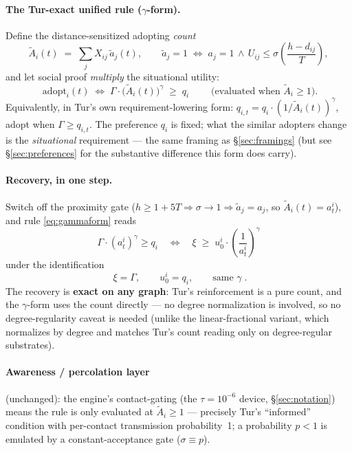 \documentclass[11pt,a4paper]{article}
\newcommand{\atil}{\tilde{a}}               %
\newcommand{\Acount}{\tilde{A}}             %
\begin{document}
\paragraph{The Tur-exact unified rule ($\gamma$-form).} Define the distance-sensitized
adopting \emph{count}
\begin{equation}
  \Acount_i(t) \;=\; \sum_{j} X_{ij}\, \atil_j(t),
  \qquad
  \atil_j = 1 \;\iff\; a_j = 1 \,\wedge\, U_{ij} \le \sigma\!\left(\frac{h - d_{ij}}{T}\right),
  \label{eq:count}
\end{equation}
and let social proof \emph{multiply} the situational utility:
\begin{equation}
  \boxed{\;\text{adopt}_i(t) \;\iff\; \Gamma \cdot \bigl(\Acount_i(t)\bigr)^{\gamma} \;\ge\; q_i\;}
  \qquad \text{(evaluated when } \Acount_i \ge 1\text{)}.
  \label{eq:gammaform}
\end{equation}
Equivalently, in Tur's own requirement-lowering form:
$q_{i,t} = q_i \cdot (1/\Acount_i(t))^{\gamma}$, adopt when $\Gamma \ge q_{i,t}$. The
preference $q_i$ is fixed; what the similar adopters change is the \emph{situational}
requirement --- the same framing as \S\ref{sec:framings} (but see
\S\ref{sec:preferences} for the substantive difference this form does carry).

\paragraph{Recovery, in one step.} Switch off the proximity gate
($h \ge 1 + 5T \Rightarrow \sigma \to 1 \Rightarrow \atil_j = a_j$, so
$\Acount_i(t) = a_t^i$), and rule \eqref{eq:gammaform} reads
\begin{equation}
  \Gamma \cdot (a_t^i)^{\gamma} \ge q_i
  \quad\iff\quad
  \xi \;\ge\; u_0^i \cdot \left(\frac{1}{a_t^i}\right)^{\gamma}
\end{equation}
under the identification
\begin{equation}
  \boxed{\;\xi = \Gamma, \qquad u_0^i = q_i, \qquad \text{same } \gamma\;.}
\end{equation}
The recovery is \textbf{exact on any graph}: Tur's reinforcement is a pure count, and the
$\gamma$-form uses the count directly --- no degree normalization is involved, so no
degree-regularity caveat is needed (unlike the linear-fractional variant, which
normalizes by degree and matches Tur's count reading only on degree-regular substrates).

\paragraph{Awareness / percolation layer} (unchanged): the engine's contact-gating (the
$\tau = 10^{-6}$ device, \S\ref{sec:notation}) means the rule is only evaluated at
$\Acount_i \ge 1$ --- precisely Tur's ``informed'' condition with per-contact
transmission probability~1; a probability $p < 1$ is emulated by a constant-acceptance
gate ($\sigma \equiv p$).
\end{document}

